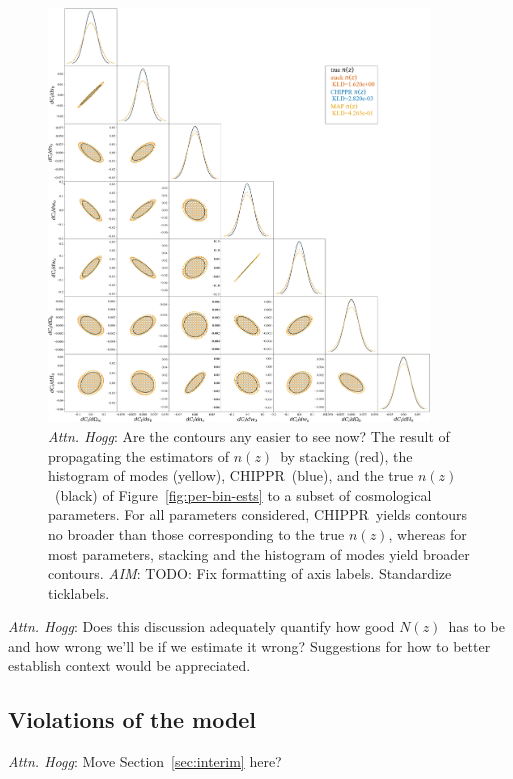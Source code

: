 \documentclass[iop]{emulateapj}
\newcommand{\todo}[3]{{\color{#2}\emph{#1}: #3}}
\newcommand{\aim}[1]{\todo{AIM}{red}{#1}}
\newcommand{\dwh}[1]{\todo{Attn. Hogg}{blue}{#1}}
\newcommand{\Sect}[1]{Section~\ref{#1}}
\newcommand{\Fig}[1]{Figure~\ref{#1}}
\newcommand{\project}[1]{\textsc{#1}}
\newcommand{\Chippr}{\project{CHIPPR}}%
\newcommand{\nz}{$n(z)$}
\newcommand{\Nz}{$N(z)$}
\begin{document}
\begin{figure}
	\begin{center}
		\includegraphics[width=0.9\textwidth]{figures/chippr/final_plot.png}
		\caption{
			\dwh{Are the contours any easier to see now?}
			The result of propagating the estimators of \nz\ by stacking (red), the histogram of modes (yellow), \Chippr\ (blue), and the true \nz\ (black) of \Fig{fig:per-bin-ests} to a subset of cosmological parameters.
			For all parameters considered, \Chippr\ yields contours no broader than those corresponding to the true \nz, whereas for most parameters, stacking and the histogram of modes yield broader contours.
			\aim{TODO: Fix formatting of axis labels.
			Standardize ticklabels.}
		}
		\label{fig:cornerplot}
	\end{center}
\end{figure}

\dwh{Does this discussion adequately quantify how good \Nz\ has to be and how wrong we'll be if we estimate it wrong?
	Suggestions for how to better establish context would be appreciated.}

\subsection{Violations of the model}
\label{sec:violations}

\dwh{Move \Sect{sec:interim} here?}
\end{document}
